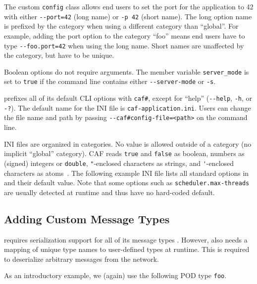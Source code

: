 The custom \lstinline^config^ class allows end users to set the port for the application to 42 with either \lstinline^--port=42^ (long name) or \lstinline^-p 42^ (short name). The long option name is prefixed by the category when using a different category than ``global''. For example, adding the port option to the category ``foo'' means end users have to type \lstinline^--foo.port=42^ when using the long name. Short names are unaffected by the category, but have to be unique.

Boolean options do not require arguments. The member variable \lstinline^server_mode^ is set to \lstinline^true^ if the command line contains either \lstinline^--server-mode^ or \lstinline^-s^.

\lib prefixes all of its default CLI options with \lstinline^caf#^, except for ``help'' (\lstinline^--help^, \lstinline^-h^, or \lstinline^-?^). The default name for the INI file is \lstinline^caf-application.ini^. Users can change the file name and path by passing \lstinline^--caf#config-file=<path>^ on the command line.

INI files are organized in categories. No value is allowed outside of a category (no implicit ``global'' category). CAF reads \lstinline^true^ and \lstinline^false^ as boolean, numbers as (signed) integers or \lstinline^double^, \lstinline^"^-enclosed characters as strings, and \lstinline^'^-enclosed characters as atoms~. The following example INI file lists all standard options in \lib and their default value. Note that some options such as \lstinline^scheduler.max-threads^ are usually detected at runtime and thus have no hard-coded default.

\clearpage


\clearpage
\subsection{Adding Custom Message Types}
\label{add-custom-message-type}

\lib requires serialization support for all of its message types . However, \lib also needs a mapping of unique type names to user-defined types at runtime. This is required to deserialize arbitrary messages from the network.

As an introductory example, we (again) use the following POD type \lstinline^foo^.



